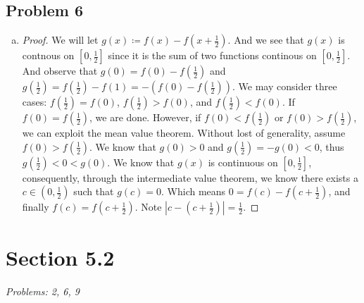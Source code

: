\documentclass[12pt]{article}
\begin{document}
\subsection*{Problem 6}
\begin{enumerate}[a).]
    \item {
        \begin{proof}
            We will let $g(x) \coloneq f(x) - f(x + \frac{1}{2})$. 
            And we see that $g(x)$ is contnous on $[0,\frac{1}{2}]$ since it is the sum of two functions continous on $[0,\frac{1}{2}]$.
            And observe that $g(0) = f(0) - f(\frac{1}{2})$ and $g(\frac{1}{2}) = f(\frac{1}{2}) - f(1) = -(f(0) - f(\frac{1}{2})) $. 
            We may consider three cases: $f(\frac{1}{2}) = f(0)$, $f(\frac{1}{2}) > f(0)$, and $f(\frac{1}{2}) < f(0)$. 
            If $f(0) = f(\frac{1}{2})$, we are done. However, if $f(0) < f(\frac{1}{2})$ or $f(0) > f(\frac{1}{2})$, we can exploit the mean value theorem. 
            Without lost of generality, assume $f(0) > f(\frac{1}{2})$. 
            We know that $g(0) > 0$ and $g(\frac{1}{2}) = - g(0) < 0$, thus $g(\frac{1}{2}) < 0 < g(0)$. 
            We know that $g(x)$ is continuous on $[0,\frac{1}{2}]$, consequently, through the intermediate value theorem, we know there exists a $c \in (0,\frac{1}{2})$ such that $g(c) = 0$.
            Which means $0 = f(c) - f(c+\frac{1}{2})$, and finally $f(c) = f(c+\frac{1}{2})$. Note $|c - (c+\frac{1}{2})| = \frac{1}{2}$.
            
        \end{proof}
    }
\end{enumerate}

\vspace*{1cm}


\section*{Section 5.2}
\textit{Problems: 2, 6, 9}
\end{document}
